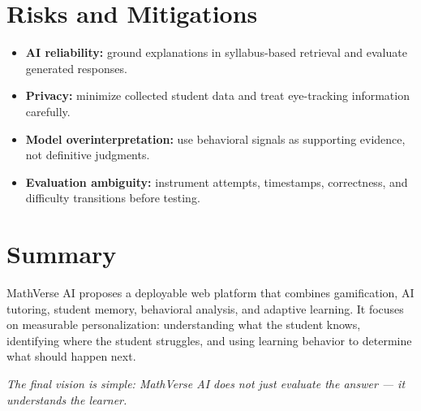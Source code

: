 \documentclass[11pt]{article}
\begin{document}
\section{Risks and Mitigations}
\begin{itemize}
    \item \textbf{AI reliability:} ground explanations in syllabus-based retrieval and evaluate generated responses.
    \item \textbf{Privacy:} minimize collected student data and treat eye-tracking information carefully.
    \item \textbf{Model overinterpretation:} use behavioral signals as supporting evidence, not definitive judgments.
    \item \textbf{Evaluation ambiguity:} instrument attempts, timestamps, correctness, and difficulty transitions before testing.
\end{itemize}

\section{Summary}
MathVerse AI proposes a deployable web platform that combines gamification, AI tutoring, student memory, behavioral analysis, and adaptive learning. It focuses on measurable personalization: understanding what the student knows, identifying where the student struggles, and using learning behavior to determine what should happen next.

\begin{center}
\textit{The final vision is simple: MathVerse AI does not just evaluate the answer --- it understands the learner.}
\end{center}
\end{document}
